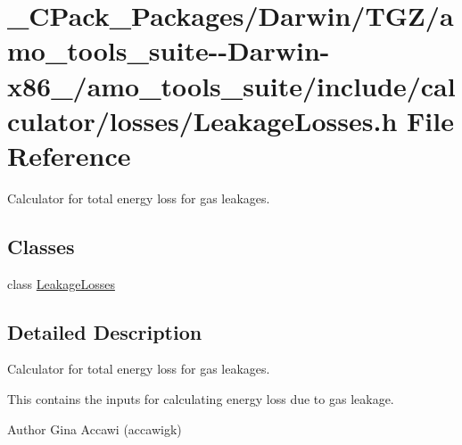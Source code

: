 \hypertarget{___c_pack___packages_2_darwin_2_t_g_z_2amo__tools__suite--_darwin-x86__64_2amo__tools__suite_2in632d2b018d2f0c9b9a93744fd29c6975}{}\section{\+\_\+\+C\+Pack\+\_\+\+Packages/\+Darwin/\+T\+G\+Z/amo\+\_\+tools\+\_\+suite-\/-\/\+Darwin-\/x86\+\_/amo\+\_\+tools\+\_\+suite/include/calculator/losses/\+Leakage\+Losses.h File Reference}
\label{___c_pack___packages_2_darwin_2_t_g_z_2amo__tools__suite--_darwin-x86__64_2amo__tools__suite_2in632d2b018d2f0c9b9a93744fd29c6975}


Calculator for total energy loss for gas leakages.  


\subsection*{Classes}
\begin{DoxyCompactItemize}
\item 
class \hyperlink{class_leakage_losses}{Leakage\+Losses}
\end{DoxyCompactItemize}


\subsection{Detailed Description}
Calculator for total energy loss for gas leakages. 

This contains the inputs for calculating energy loss due to gas leakage.

\begin{DoxyAuthor}{Author}
Gina Accawi (accawigk) 
\end{DoxyAuthor}
